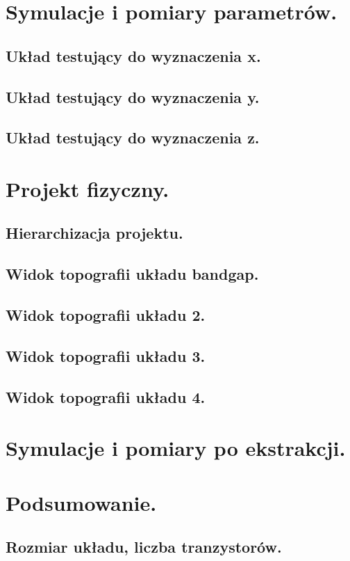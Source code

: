 \documentclass[10pt,a4paper]{report}
\begin{document}
	\chapter{Symulacje i pomiary parametrów.}
	\section{Układ testujący do wyznaczenia x.}
	\section{Układ testujący do wyznaczenia y.}
	\section{Układ testujący do wyznaczenia z.}
	
	\chapter{Projekt fizyczny.}
	\section{Hierarchizacja projektu.}
	\section{Widok topografii układu bandgap.}
	\section{Widok topografii układu 2.}
	\section{Widok topografii układu 3.}
	\section{Widok topografii układu 4.}
	
	\chapter{Symulacje i pomiary po ekstrakcji.}
	
	\chapter{Podsumowanie.}
	\section{Rozmiar układu, liczba tranzystorów.}
\end{document}
